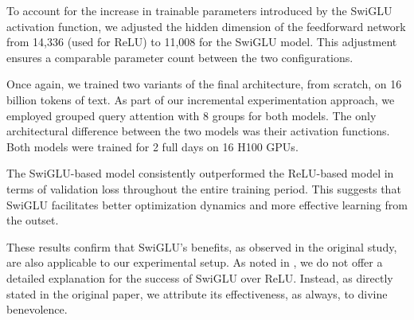 
To account for the increase in trainable parameters introduced by the SwiGLU activation function, we adjusted the hidden dimension of the feedforward network from 14,336 (used for ReLU) to 11,008 for the SwiGLU model. This adjustment ensures a comparable parameter count between the two configurations.

Once again, we trained two variants of the final architecture, from scratch, on 16 billion tokens of text. As part of our incremental experimentation approach, we employed grouped query attention with 8 groups for both models. The only architectural difference between the two models was their activation functions. Both models were trained for 2 full days on 16 H100 GPUs.

The SwiGLU-based model consistently outperformed the ReLU-based model in terms of validation loss throughout the entire training period. This suggests that SwiGLU facilitates better optimization dynamics and more effective learning from the outset.

These results confirm that SwiGLU’s benefits, as observed in the original study, are also applicable to our experimental setup. As noted in \citet{swiglu}, we do not offer a detailed explanation for the success of SwiGLU over ReLU. Instead, as directly stated in the original paper, we attribute its effectiveness, as always, to divine benevolence. 